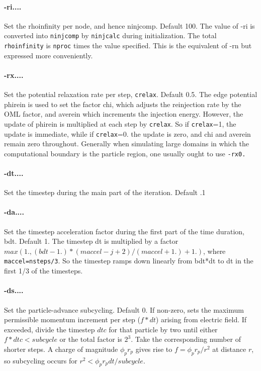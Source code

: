 \documentclass[12pt]{article}
\begin{document}
\paragraph{-ri....} Set the rhoinfinity per node, and hence
ninjcomp. Default 100. 
The value of -ri is converted into \verb!ninjcomp! by \verb!ninjcalc! during
initialization. The total \verb!rhoinfinity! is \verb!nproc! times the value
specified. This is the equivalent of -rn but expressed more conveniently.

\paragraph{-rx....} 
Set the potential relaxation rate per step, \verb!crelax!. Default 0.5.
The edge potential phirein is used to set the factor chi, which
adjusts the reinjection rate by the OML factor, and averein which
increments the injection energy. However, the update of phirein is
multiplied at each step by \verb!crelax!. So if \verb!crelax!=1, the update is
immediate, while if \verb!crelax!=0. the update is zero, and chi and averein
remain zero throughout. Generally when simulating large domains in
which the computational boundary is the particle region, one usually
ought to use \verb!-rx0.!

\paragraph{-dt....}
 Set the timestep during the main part of the iteration. Default .1

\paragraph{-da....}
 Set the timestep acceleration factor during the first part of
 the time duration, bdt. Default 1. The timestep dt is multiplied by a
 factor $max(1.,(bdt-1.)*(maccel-j+2)/(maccel+1.)+1.)$, where
 \verb!maccel=nsteps/3!.  So the timestep ramps down linearly from bdt*dt to
 dt in the first 1/3 of the timesteps.

\paragraph{-ds....}
Set the particle-advance subcycling. Default 0.  If non-zero, sets the
maximum permissible momentum increment per step ($f*dt$) arising from
electric field. If exceeded, divide the timestep $dtc$ for that
particle by two until either $f*dtc<subcycle$ or the total factor is
$2^3$. Take the corresponding number of shorter steps. A charge of
magnitude $\phi_pr_p$ gives rise to $f=\phi_pr_p/r^2$ at distance $r$,
so subcycling occurs for $r^2<\phi_pr_pdt/subcycle$.
\end{document}
